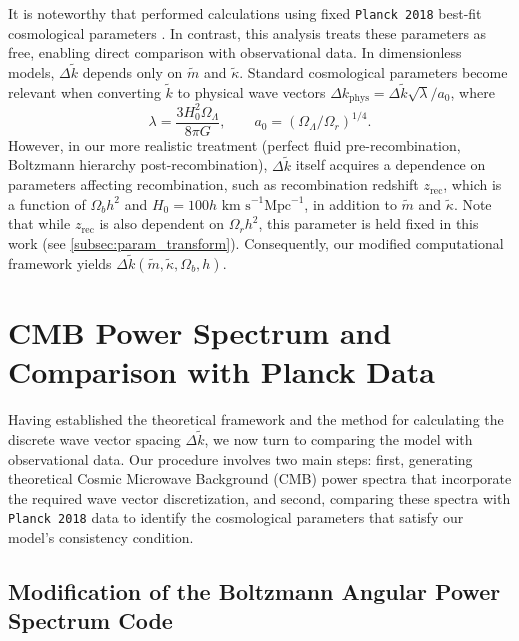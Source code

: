 It is noteworthy that \cite{2022PhRvD.105l3508P} performed calculations using fixed \texttt{Planck 2018} best-fit cosmological parameters \cite{2020A&A...641A...6P}. In contrast, this analysis treats these parameters as free, enabling direct comparison with observational data. %
In dimensionless models, $\Delta\tilde k$ depends only on $\tilde m$ and $\tilde \kappa$. Standard cosmological parameters become relevant when converting $\tilde k$ to physical wave vectors $\Delta k_{\mathrm{phys}}= \Delta\tilde k\sqrt{\lambda}/a_0$, where
\[ \lambda = \frac{3H_0^2\Omega_\Lambda}{8\pi G %
}, \qquad a_0=(\Omega_\Lambda/\Omega_r)^{1/4}. \]
However, in our more realistic treatment (perfect fluid pre-recombination, Boltzmann hierarchy post-recombination), $\Delta\tilde k$ itself acquires a dependence on parameters affecting recombination, such as recombination redshift $z_{\mathrm{rec}}$, which is a function of $\Omega_b h^2$ and $H_0 = 100h \text{ km s}^{-1}\text{Mpc}^{-1}$, in addition to $\tilde m$ and $\tilde \kappa$. Note that while $z_{\mathrm{rec}}$ is also dependent on $\Omega_rh^2$, this parameter is held fixed in this work (see \ref{subsec:param_transform}). 
Consequently, our modified computational framework yields $\Delta\tilde k(\tilde m, \tilde \kappa, \Omega_b, h)$. %


\section{CMB Power Spectrum and Comparison with Planck Data}\label{sec:CMB}

Having established the theoretical framework and the method for calculating the discrete wave vector spacing $\Delta\tilde{k}$, we now turn to comparing the model with observational data. Our procedure involves two main steps: first, generating theoretical Cosmic Microwave Background (CMB) power spectra that incorporate the required wave vector discretization, and second, comparing these spectra with \texttt{Planck 2018} data to identify the cosmological parameters that satisfy our model's consistency condition.

\subsection{Modification of the Boltzmann Angular Power Spectrum Code}\label{subsec:modify_CLASS}

